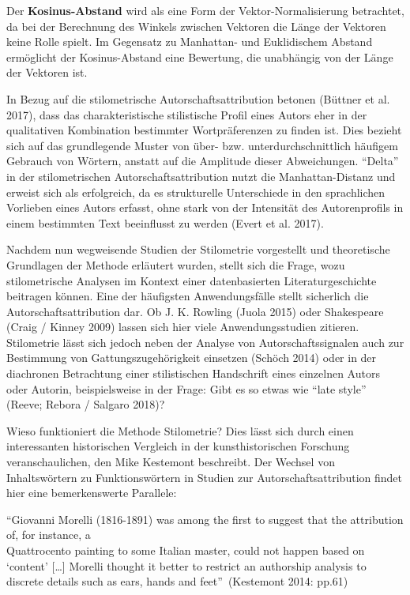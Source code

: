 \documentclass[
  12pt,
  letterpaper,
]{classicthesis}
\begin{document}
Der \textbf{Kosinus-Abstand} wird als eine Form der
Vektor-Normalisierung betrachtet, da bei der Berechnung des Winkels
zwischen Vektoren die Länge der Vektoren keine Rolle spielt. Im
Gegensatz zu Manhattan- und Euklidischem Abstand ermöglicht der
Kosinus-Abstand eine Bewertung, die unabhängig von der Länge der
Vektoren ist.

In Bezug auf die stilometrische Autorschaftsattribution betonen (Büttner
et al. 2017), dass das charakteristische stilistische Profil eines
Autors eher in der qualitativen Kombination bestimmter Wortpräferenzen
zu finden ist. Dies bezieht sich auf das grundlegende Muster von über-
bzw. unterdurchschnittlich häufigem Gebrauch von Wörtern, anstatt auf
die Amplitude dieser Abweichungen. ``Delta'' in der stilometrischen
Autorschaftsattribution nutzt die Manhattan-Distanz und erweist sich als
erfolgreich, da es strukturelle Unterschiede in den sprachlichen
Vorlieben eines Autors erfasst, ohne stark von der Intensität des
Autorenprofils in einem bestimmten Text beeinflusst zu werden (Evert et
al. 2017).

Nachdem nun wegweisende Studien der Stilometrie vorgestellt und
theoretische Grundlagen der Methode erläutert wurden, stellt sich die
Frage, wozu stilometrische Analysen im Kontext einer datenbasierten
Literaturgeschichte beitragen können. Eine der häufigsten
Anwendungsfälle stellt sicherlich die Autorschaftsattribution dar. Ob J.
K. Rowling (Juola 2015) oder Shakespeare (Craig / Kinney 2009) lassen
sich hier viele Anwendungsstudien zitieren.\\
Stilometrie lässt sich jedoch neben der Analyse von Autorschaftssignalen
auch zur Bestimmung von Gattungszugehörigkeit einsetzen (Schöch 2014)
oder in der diachronen Betrachtung einer stilistischen Handschrift eines
einzelnen Autors oder Autorin, beispielsweise in der Frage: Gibt es so
etwas wie ``late style'' (Reeve; Rebora / Salgaro 2018)?

Wieso funktioniert die Methode Stilometrie? Dies lässt sich durch einen
interessanten historischen Vergleich in der kunsthistorischen Forschung
veranschaulichen, den Mike Kestemont beschreibt. Der Wechsel von
Inhaltswörtern zu Funktionswörtern in Studien zur
Autorschaftsattribution findet hier eine bemerkenswerte Parallele:

``Giovanni Morelli (1816-1891) was among the first to suggest that the
attribution of, for instance, a\\
Quattrocento painting to some Italian master, could not happen based on
`content' {[}\ldots{]} Morelli thought it better to restrict an
authorship analysis to discrete details such as ears, hands and
feet''~(Kestemont 2014: pp.61)
\end{document}
